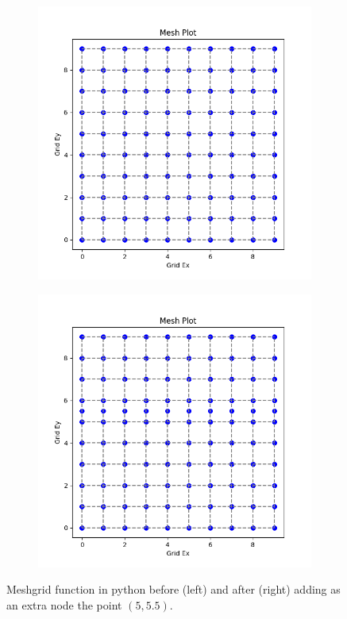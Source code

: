 \documentclass[12pt, oneside]{book}
\begin{document}
\begin{figure}[H]
    \centering
    \begin{subfigure}[b]{0.49\textwidth}
        \centering
        \includegraphics[width=\textwidth]{Imagenes/CFDTD2D_Meshgrid1.png}
    \end{subfigure}
    \begin{subfigure}[b]{0.49\textwidth}
        \centering
        \includegraphics[width=\textwidth]{Imagenes/CFDTD2D_Meshgrid2.png}
    \end{subfigure}
    \caption{Meshgrid function in python before (left) and after (right) adding as an extra node the point $(5, 5.5)$.}
    \label{fig:CFDTD2D_Meshgrid}
\end{figure}
\end{document}
